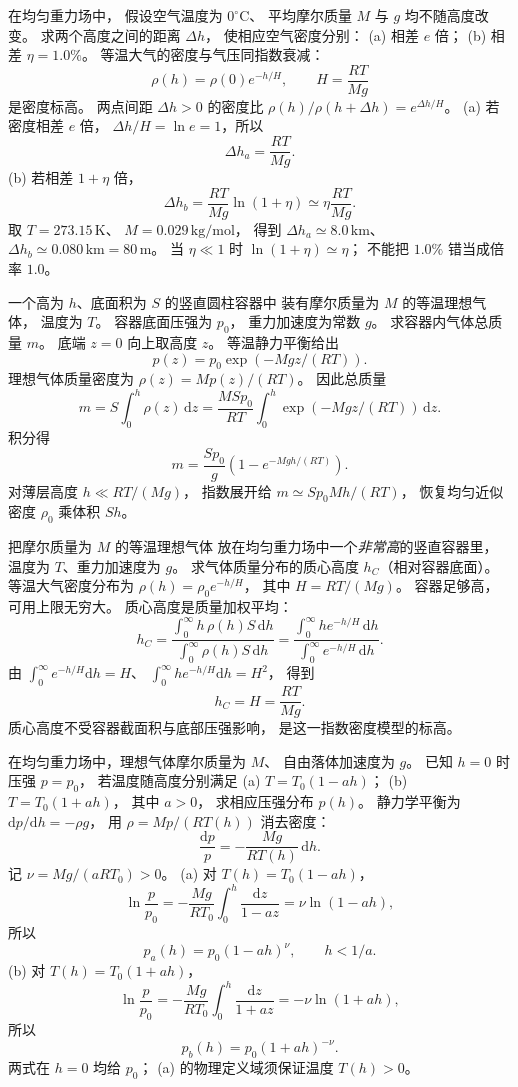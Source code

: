 在均匀重力场中，
假设空气温度为 $0^\circ\mathrm C$、
平均摩尔质量 $M$ 与 $g$ 均不随高度改变。
求两个高度之间的距离 $\Delta h$，
使相应空气密度分别：
(a) 相差 $e$ 倍；
(b) 相差 $\eta=1.0\%$。
\exsolution
等温大气的密度与气压同指数衰减：
\[
\rho(h)=\rho(0)e^{-h/H},
\qquad H=\frac{RT}{Mg}
\]
是密度标高。
两点间距 $\Delta h>0$ 的密度比
$\rho(h)/\rho(h+\Delta h)=e^{\Delta h/H}$。
(a) 若密度相差 $e$ 倍，
$\Delta h/H=\ln e=1$，所以
\[
\boxed{\Delta h_a=\frac{RT}{Mg}}.
\]
(b) 若相差 $1+\eta$ 倍，
\[
\boxed{\Delta h_b=\frac{RT}{Mg}\ln(1+\eta)
\simeq\eta\frac{RT}{Mg}}.
\]
取 $T=273.15\,\mathrm K$、
$M=0.029\,\mathrm{kg/mol}$，
得到
$\boxed{\Delta h_a\simeq8.0\,\mathrm{km}}$、
$\boxed{\Delta h_b\simeq0.080\,\mathrm{km}=80\,\mathrm m}$。
\excheck 当 $\eta\ll1$ 时
$\ln(1+\eta)\simeq\eta$；
不能把 $1.0\%$ 错当成倍率 $1.0$。

一个高为 $h$、底面积为 $S$ 的竖直圆柱容器中
装有摩尔质量为 $M$ 的等温理想气体，
温度为 $T$。
容器底面压强为 $p_0$，
重力加速度为常数 $g$。
求容器内气体总质量 $m$。
\exsolution
底端 $z=0$ 向上取高度 $z$。
等温静力平衡给出
\[
p(z)=p_0\exp(-Mg z/(RT)).
\]
理想气体质量密度为
$\rho(z)=Mp(z)/(RT)$。
因此总质量
\[
m=S\int_0^h\rho(z)\,\mathrm dz
=\frac{MS p_0}{RT}
\int_0^h\exp(-Mg z/(RT))\,\mathrm dz.
\]
积分得
\[
\boxed{m=\frac{S p_0}{g}
\left(1-e^{-Mgh/(RT)}\right)}.
\]
\excheck 对薄层高度 $h\ll RT/(Mg)$，
指数展开给
$m\simeq S p_0 M h/(RT)$，
恢复均匀近似密度 $\rho_0$ 乘体积 $Sh$。

把摩尔质量为 $M$ 的等温理想气体
放在均匀重力场中一个\emph{非常高}的竖直容器里，
温度为 $T$、重力加速度为 $g$。
求气体质量分布的质心高度
$h_C$（相对容器底面）。
\exsolution
等温大气密度分布为
$\rho(h)=\rho_0e^{-h/H}$，
其中 $H=RT/(Mg)$。
容器足够高，可用上限无穷大。
质心高度是质量加权平均：
\[
h_C=\frac{\int_0^\infty h\,\rho(h)S\,\mathrm dh}
{\int_0^\infty\rho(h)S\,\mathrm dh}
=\frac{\int_0^\infty h e^{-h/H}\,\mathrm dh}
{\int_0^\infty e^{-h/H}\,\mathrm dh}.
\]
由
$\int_0^\infty e^{-h/H}\mathrm dh=H$、
$\int_0^\infty h e^{-h/H}\mathrm dh=H^2$，
得到
\[
\boxed{h_C=H=\frac{RT}{Mg}}.
\]
\excheck 质心高度不受容器截面积与底部压强影响，
是这一指数密度模型的标高。

在均匀重力场中，理想气体摩尔质量为 $M$、
自由落体加速度为 $g$。
已知 $h=0$ 时压强 $p=p_0$，
若温度随高度分别满足
(a) $T=T_0(1-ah)$；
(b) $T=T_0(1+ah)$，
其中 $a>0$，
求相应压强分布 $p(h)$。
\exsolution
静力学平衡为
$\mathrm dp/\mathrm dh=-\rho g$，
用
$\rho=Mp/(RT(h))$ 消去密度：
\[
\frac{\mathrm dp}{p}
=-\frac{Mg}{RT(h)}\,\mathrm dh.
\]
记
$\nu=Mg/(aRT_0)>0$。
(a) 对 $T(h)=T_0(1-ah)$，
\[
\ln\frac p{p_0}
=-\frac{Mg}{RT_0}\int_0^h\frac{\mathrm dz}{1-az}
=\nu\ln(1-ah),
\]
所以
\[
\boxed{p_a(h)=p_0(1-ah)^\nu},
\qquad h<1/a.
\]
(b) 对 $T(h)=T_0(1+ah)$，
\[
\ln\frac p{p_0}
=-\frac{Mg}{RT_0}\int_0^h\frac{\mathrm dz}{1+az}
=-\nu\ln(1+ah),
\]
所以
\[
\boxed{p_b(h)=p_0(1+ah)^{-\nu}}.
\]
\excheck 两式在 $h=0$ 均给 $p_0$；
(a) 的物理定义域须保证温度 $T(h)>0$。

